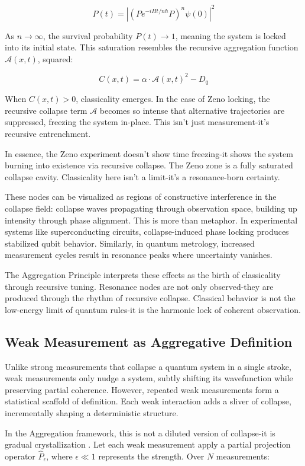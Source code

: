 \[
P(t) = \left| \left( P e^{-iHt/n\hbar} P \right)^n \psi(0) \right|^2
\]

As \( n \to \infty \), the survival probability \( P(t) \to 1 \), meaning the system is locked into its initial state. This saturation resembles the recursive aggregation function \( \mathcal{A}(x,t) \), squared:

\[
C(x,t) = \alpha \cdot \mathcal{A}(x,t)^2 - D_q
\]

When \( C(x,t) > 0 \), classicality emerges. In the case of Zeno locking, the recursive collapse term \( \mathcal{A} \) becomes so intense that alternative trajectories are suppressed, freezing the system in-place. This isn't just measurement-it’s recursive entrenchment.

In essence, the Zeno experiment doesn’t show time freezing-it shows the system  burning into existence  via recursive collapse. The Zeno zone is a fully saturated collapse cavity. Classicality here isn't a limit-it's a resonance-born certainty.

These nodes can be visualized as regions of constructive interference in the collapse field: collapse waves propagating through observation space, building up intensity through phase alignment. This is more than metaphor. In experimental systems like superconducting circuits, collapse-induced phase locking produces stabilized qubit behavior. Similarly, in quantum metrology, increased measurement cycles result in resonance peaks where uncertainty vanishes.

The Aggregation Principle interprets these effects as the birth of classicality through recursive tuning. Resonance nodes are not only observed-they are produced through the rhythm of recursive collapse. Classical behavior is not the low-energy limit of quantum rules-it is the harmonic lock of coherent observation.

\subsection{Weak Measurement as Aggregative Definition}

Unlike strong measurements that collapse a quantum system in a single stroke,  weak measurements  only nudge a system, subtly shifting its wavefunction while preserving partial coherence. However, repeated weak measurements form a statistical scaffold of definition. Each weak interaction adds a sliver of collapse, incrementally shaping a deterministic structure.

In the Aggregation framework, this is not a diluted version of collapse-it is  gradual crystallization . Let each weak measurement apply a partial projection operator \( \hat{P}_\epsilon \), where \( \epsilon \ll 1 \) represents the strength. Over \( N \) measurements:

